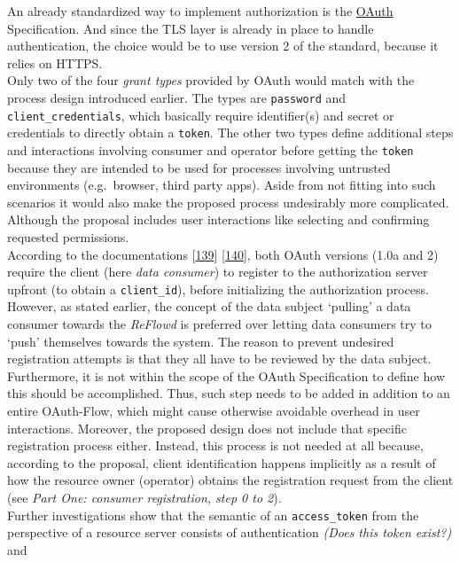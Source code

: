 \documentclass[12pt,english,a4paper,titlepage,cleardoublepage=empty,dottedtoc]{report}
\begin{document}
An already standardized way to implement authorization is the
\protect\hyperlink{def--oauth}{OAuth} Specification. And since the TLS
layer is already in place to handle authentication, the choice would be
to use version 2 of the standard, because it relies on HTTPS.\\
Only two of the four \emph{grant types} provided by OAuth would match
with the process design introduced earlier. The types are
\texttt{password} and \texttt{client\_credentials}, which basically
require identifier(s) and secret or credentials to directly obtain a
\texttt{token}. The other two types define additional steps and
interactions involving consumer and operator before getting the
\texttt{token} because they are intended to be used for processes
involving untrusted environments (e.g.~browser, third party apps). Aside
from not fitting into such scenarios it would also make the proposed
process undesirably more complicated. Although the proposal includes
user interactions like selecting and confirming requested permissions.\\
According to the documentations
{[}\protect\hyperlink{ref-web_spec_oauth-1a_client-reg}{139}{]}
{[}\protect\hyperlink{ref-web_spec_oauth-2_client-reg}{140}{]}, both
OAuth versions (1.0a and 2) require the client (here \emph{data
consumer}) to register to the authorization server upfront (to obtain a
\texttt{client\_id}), before initializing the authorization process.
However, as stated earlier, the concept of the data subject `pulling' a
data consumer towards the \emph{ReFlowd} is preferred over letting data
consumers try to `push' themselves towards the system. The reason to
prevent undesired registration attempts is that they all have to be
reviewed by the data subject. Furthermore, it is not within the scope of
the OAuth Specification to define how this should be accomplished. Thus,
such step needs to be added in addition to an entire OAuth-Flow, which
might cause otherwise avoidable overhead in user interactions. Moreover,
the proposed design does not include that specific registration process
either. Instead, this process is not needed at all because, according to
the proposal, client identification happens implicitly as a result of
how the resource owner (operator) obtains the registration request from
the client (see \emph{Part One: consumer registration, step 0 to 2}).\\
Further investigations show that the semantic of an
\texttt{access\_token} from the perspective of a resource server
consists of authentication \emph{(Does this token exist?)} and
\end{document}
